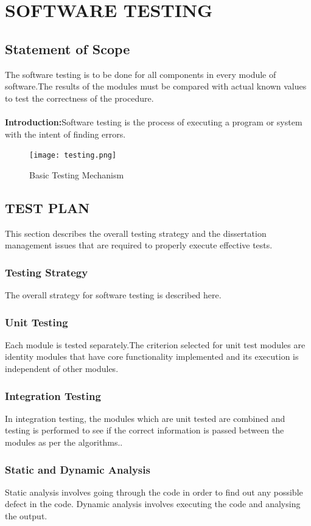 \documentclass[oneside,a4paper,12pt]{report}
\begin{document}
 
\chapter{SOFTWARE TESTING}
\newpage
\section{Statement of Scope}
The software testing is to be done for all components in every module of software.The results of the modules must be compared with actual known values to test the correctness of the procedure.\\
\\
\textbf{Introduction:}Software testing is the process of executing a program or system with the intent of finding errors.
\begin{figure}[h]
\centering
\texttt{[image: testing.png]}
\caption{Basic Testing Mechanism}
\end{figure}
\section{TEST PLAN}
\hspace*{0.3in}This section describes the overall testing strategy and the dissertation management issues that are required to properly execute effective tests.
\subsection{Testing Strategy}
The overall strategy for software testing is described here.
\subsection{Unit Testing}
\hspace*{0.3in}Each module is tested separately.The criterion selected for unit test modules are identity modules that have core functionality implemented and its execution is independent of other modules.\subsection{Integration Testing}
\hspace*{0.3in}In integration testing, the modules which are unit tested are combined and testing is performed to see if the correct information is passed between the modules as per the algorithms..
\subsection{Static and Dynamic Analysis}
\hspace*{0.3in}Static analysis involves going through the code in order to find out any possible defect in the code. Dynamic analysis involves executing the code and analysing the output.
\end{document}
